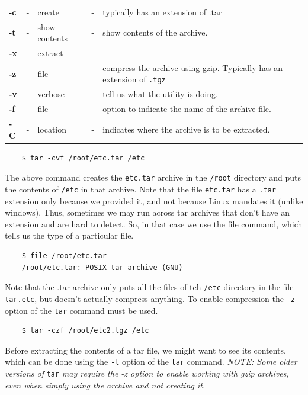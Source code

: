 \documentclass{report}
\begin{document}
	\begin{tabular}{lclcl}
		\textbf{-c} &- &create &- &typically has an extension of .tar \\
		\textbf{-t} &- &show contents &- &show contents of the archive. \\
		\textbf{-x} &- &extract & & \\
		\textbf{-z} &- &file &- &compress the archive using gzip. Typically has an extension of \verb|.tgz| \\
		\textbf{-v} &- &verbose &- &tell us what the utility is doing. \\
		\textbf{-f} &- &file &- &option to indicate the name of the archive file. \\
		\textbf{-C} &- &location &- &indicates where the archive is to be extracted. \\		
	\end{tabular}

	\begin{verbatim}
	$ tar -cvf /root/etc.tar /etc
	\end{verbatim}
	
	\noindent
	The above command creates the \verb|etc.tar| archive in the \verb|/root| directory and puts the contents of \verb|/etc| in that archive. Note that the file \verb|etc.tar| has a \verb|.tar| extension only because we provided it, and not because Linux mandates it (unlike windows). Thus, sometimes we may run across tar archives that don't have an extension and are hard to detect. So, in that case we use the file command, which tells us the type of a particular file.
	
	\begin{verbatim}
	$ file /root/etc.tar
	/root/etc.tar: POSIX tar archive (GNU)
	\end{verbatim}
	
	\noindent
	Note that the .tar archive only puts all the files of teh \verb|/etc| directory in the file \verb|tar.etc|, but doesn't actually compress anything. To enable compression the \verb|-z| option of the \verb|tar| command must be used. 
	
	\begin{verbatim}
	$ tar -czf /root/etc2.tgz /etc
	\end{verbatim}
	
	\noindent
	Before extracting the contents of a tar file, we might want to see its contents, which can be done using the \verb|-t| option of the \verb|tar| command. \textit{NOTE: Some older versions of} \verb|tar| \textit{may require the -z option to enable working with gzip archives, even when simply using the archive and not creating it.}
	
\end{document}

